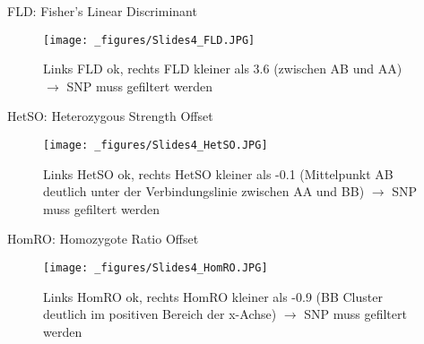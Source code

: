\documentclass{beamer}
\begin{document}
\begin{frame}{FLD: Fisher’s Linear Discriminant}
\begin{figure}
    \centering
    \texttt{[image: \_figures/Slides4\_FLD.JPG]}
    \caption{Links FLD ok, rechts FLD kleiner als 3.6 (zwischen AB und AA) $\rightarrow$ SNP muss gefiltert werden}
    \label{fig:FLD}
\end{figure}
\end{frame}

\begin{frame}{HetSO: Heterozygous Strength Offset}
\begin{figure}
    \centering
    \texttt{[image: \_figures/Slides4\_HetSO.JPG]}
    \caption{Links HetSO ok, rechts HetSO kleiner als -0.1 (Mittelpunkt AB deutlich unter der Verbindungslinie zwischen AA und BB) $\rightarrow$ SNP muss gefiltert werden}
    \label{fig:HetSO}
\end{figure}
\end{frame}

\begin{frame}{HomRO: Homozygote Ratio Offset}
\begin{figure}
    \centering
    \texttt{[image: \_figures/Slides4\_HomRO.JPG]}
    \caption{Links HomRO ok, rechts HomRO kleiner als -0.9 (BB Cluster deutlich im positiven Bereich der x-Achse) $\rightarrow$ SNP muss gefiltert werden}
    \label{fig:HomRO}
\end{figure}
\end{frame}
\end{document}
